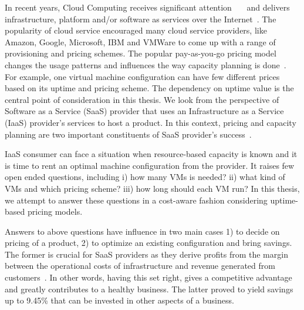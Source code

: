 \documentclass[]{final_report}
\begin{document}

In recent years, Cloud Computing receives significant attention~\cite{6185529}~\cite{5741288}~\cite{5704303} and delivers infrastructure, platform and/or software as services over the Internet~\cite{7073248}. The popularity of cloud service encouraged many cloud service providers, like Amazon, Google, Microsoft, IBM and VMWare to come up with a range of provisioning and pricing schemes. The popular pay-as-you-go pricing model changes the usage patterns and influences the way capacity planning is done~\cite{6274129}. For example, one virtual machine configuration can have few different prices based on its uptime and pricing scheme. The dependency on uptime value is the central point of consideration in this thesis. We look from the perspective of Software as a Service (SaaS) provider that uses an Infrastructure as a Service (IaaS) provider's services to host a product. In this context, pricing and capacity planning are two important constituents of SaaS provider's success~\cite{6963393}.


IaaS consumer can face a situation when resource-based capacity is known and it is time to rent an optimal machine configuration from the provider. It raises few open ended questions, including i) how many VMs is needed? ii) what kind of VMs and which pricing scheme? iii) how long should each VM run? In this thesis, we attempt to answer these questions in a cost-aware fashion considering uptime-based pricing models.


Answers to above questions have influence in two main cases 1) to decide on pricing of a product, 2) to optimize an existing configuration and bring savings.  The former is crucial for SaaS providers as they derive profits from the margin between the operational costs of infrastructure and revenue generated from customers~\cite{efficient_resource_allocation}. In other words, having this set right, gives a competitive advantage and greatly contributes to a healthy business. The latter proved to yield savings up to 9.45\% that can be invested in other aspects of a business.   

\end{document}
